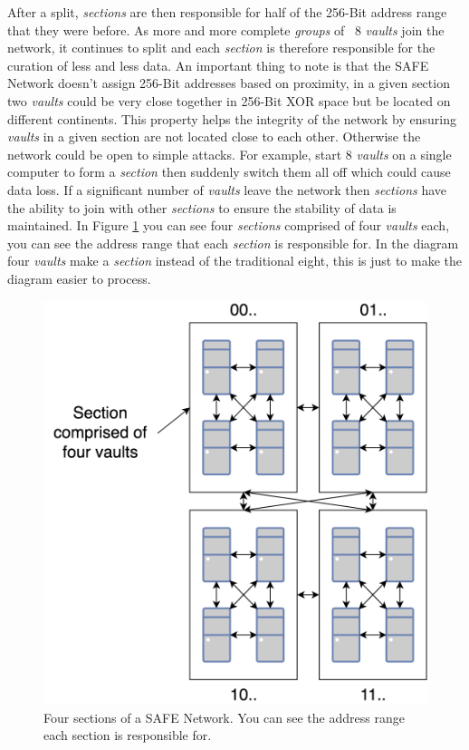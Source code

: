 After a split, \textit{sections} are then responsible for half of the 256-Bit address range that they were before. As more and more complete \textit{groups} of ~8 \textit{vaults} join the network, it continues to split and each \textit{section} is therefore responsible for the curation of less and less data. An important thing to note is that the SAFE Network doesn't assign 256-Bit addresses based on proximity, in a given section two \textit{vaults} could be very close together in 256-Bit XOR space but be located on different continents. This property helps the integrity of the network by ensuring \textit{vaults} in a given section are not located close to each other. Otherwise the network could be open to simple attacks. For example, start 8 \textit{vaults} on a single computer to form a \textit{section} then suddenly switch them all off which could cause data loss. If a significant number of \textit{vaults} leave the network then \textit{sections} have the ability to join with other \textit{sections} to ensure the stability of data is maintained. In Figure \ref{fig:safe-sections} you can see four \textit{sections} comprised of four \textit{vaults} each, you can see the address range that each \textit{section} is responsible for. In the diagram four \textit{vaults} make a \textit{section} instead of the traditional eight, this is just to make the diagram easier to process.

\begin{figure}
	\begin{center}
		\includegraphics[scale=0.3]{diagrams/safe-network-sections}
		\caption{Four sections of a SAFE Network. You can see the address range each section is responsible for.}
		\label{fig:safe-sections}
	\end{center}
\end{figure}

